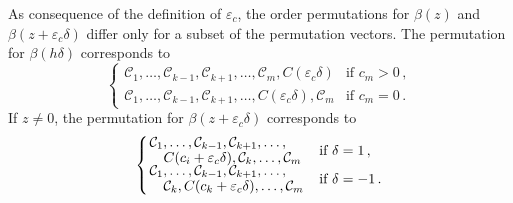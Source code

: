 \begin{remark}
  As consequence of the definition of \(\varepsilon_c\), the order permutations
  for \(\beta(z)\) and \(\beta(z + {\varepsilon_c} \delta)\) differ only for a
  subset of the permutation vectors.
  The permutation for \(\beta(h\delta)\)
  corresponds to
  \begin{equation*}
    \begin{cases}
      \mathcal{C}_1, \dots, \mathcal{C}_{k-1}, \mathcal{C}_{k+1}, \dots, \mathcal{C}_m, C({\varepsilon_c}\delta)
       & \text{if } c_m > 0 \, , \\ %
      \mathcal{C}_1, \dots, \mathcal{C}_{k-1}, \mathcal{C}_{k+1}, \dots, C({\varepsilon_c}\delta), \mathcal{C}_m
       & \text{if } c_m = 0 \, . %
    \end{cases}
  \end{equation*}
  If \(z \neq 0\), the permutation for \(\beta(z + {\varepsilon_c} \delta)\) corresponds to
  \[
    \begin{cases}
      \splitfrac{\mathcal{C}_1, \dots, \mathcal{C}_{k-1}, \mathcal{C}_{k+1}, \dots, }{C(c_i + {\varepsilon_c}\delta), \mathcal{C}_k, \dots, \mathcal{C}_m} & \text{if } \delta = 1 \,,   \\
      \splitfrac{\mathcal{C}_1, \dots, \mathcal{C}_{k-1}, \mathcal{C}_{k+1}, \dots,}{ \mathcal{C}_k, C(c_k + {\varepsilon_c}\delta), \dots, \mathcal{C}_m} & \text{if } \delta = -1 \, . \\
    \end{cases}
  \]
\end{remark}

